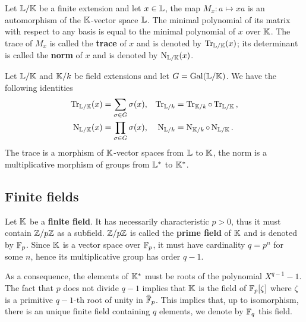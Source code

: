 Let $\mathbb{L}/\mathbb{K}$ be a finite extension and let $x\in\mathbb{L}$, the map
$M_x:a\mapsto xa$ is an automorphism of the $\mathbb{K}$-vector space
$\mathbb{L}$. The minimal polynomial of its matrix with respect to any basis
is equal to the minimal polynomial of $x$ over $\mathbb{K}$.  The trace of
$M_x$ is called the \textbf{trace} of $x$
and is denoted by
$\operatorname{Tr}_{\mathbb{L}/\mathbb{K}}(x)$; its determinant is called the \textbf{norm}
of $x$ and is denoted by
$\operatorname{N}_{\mathbb{L}/\mathbb{K}}(x)$.

\begin{proposition}
  \label{th:basic-galois-theory:trace}
  Let $\mathbb{L}/\mathbb{K}$ and $\mathbb{K}/k$ be field extensions and let
  $G=\operatorname{Gal}(\mathbb{L}/\mathbb{K})$. We have the following identities
  \begin{align*}
    \operatorname{Tr}_{\mathbb{L}/\mathbb{K}}(x) &= \sum_{\sigma\in G}\sigma(x) \text{,}&
    \operatorname{Tr}_{\mathbb{L}/k} &= \operatorname{Tr}_{\mathbb{K}/k}\circ\operatorname{Tr}_{\mathbb{L}/\mathbb{K}}\text{,}\\
    \operatorname{N}_{\mathbb{L}/\mathbb{K}}(x) &= \prod_{\sigma\in G}\sigma(x) \text{,}&
    \operatorname{N}_{\mathbb{L}/k} &= \operatorname{N}_{\mathbb{K}/k}\circ\operatorname{N}_{\mathbb{L}/\mathbb{K}}\text{.}
  \end{align*}
  The trace is a morphism of $\mathbb{K}$-vector spaces from $\mathbb{L}$ to $\mathbb{K}$,
  the norm is a multiplicative morphism of groups from $\mathbb{L}^\ast$ to
  $\mathbb{K}^\ast$.
\end{proposition}


\subsection{Finite fields}
\label{sec:basic-galois-theory:finite-fields}

Let $\mathbb{K}$ be a  \textbf{finite field}. It has
necessarily characteristic $p>0$, thus it must contain $\mathbb{Z}/p\mathbb{Z}$ as a
subfield. $\mathbb{Z}/p\mathbb{Z}$ is called the \textbf{prime
  field} of $\mathbb{K}$ and is denoted by $\mathbb{F}_p$. Since $\mathbb{K}$ is a vector
space over $\mathbb{F}_p$, it must have cardinality $q=p^n$ for some $n$,
hence its multiplicative group has order $q-1$.

As a consequence, the elements of $\mathbb{K}^\ast$ must be roots of the
polynomial $X^{q-1}-1$. The fact that $p$ does not divide $q-1$
implies that $\mathbb{K}$ is the field of $\mathbb{F}_p[\zeta]$ where $\zeta$ is a
primitive $q-1$-th root of unity in $\bar{\mathbb{F}}_p$. This implies that,
up to isomorphism, there is an unique finite field containing $q$
elements, we denote by $\mathbb{F}_q$ this field.

